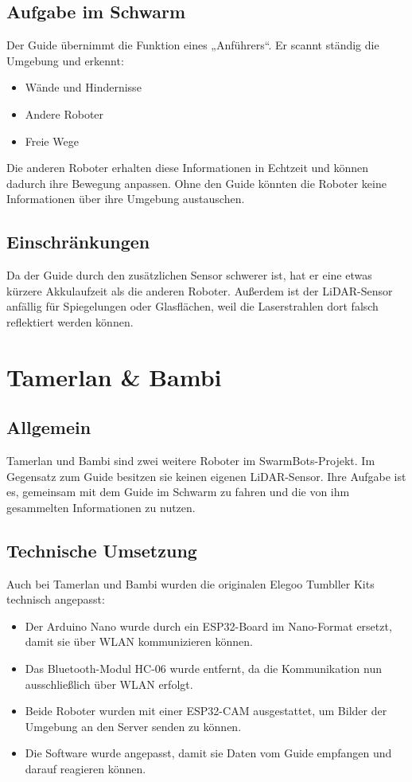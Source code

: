 \subsection{Aufgabe im Schwarm}
Der Guide übernimmt die Funktion eines „Anführers“.
Er scannt ständig die Umgebung und erkennt:
\begin{itemize}
    \item Wände und Hindernisse
    \item Andere Roboter
    \item Freie Wege
\end{itemize}
Die anderen Roboter erhalten diese Informationen in Echtzeit und können dadurch ihre Bewegung anpassen.
Ohne den Guide könnten die Roboter keine Informationen über ihre Umgebung austauschen.
%
\subsection{Einschränkungen}
Da der Guide durch den zusätzlichen Sensor schwerer ist, hat er eine etwas kürzere Akkulaufzeit als die anderen Roboter. Außerdem ist der LiDAR-Sensor anfällig für Spiegelungen oder Glasflächen, weil die Laserstrahlen dort falsch reflektiert werden können.

%
\section{Tamerlan \& Bambi}
\label{subsec:hardware_tamerlan_bambi}

\subsection{Allgemein}
Tamerlan und Bambi sind zwei weitere Roboter im SwarmBots-Projekt.
Im Gegensatz zum Guide besitzen sie keinen eigenen LiDAR-Sensor. Ihre Aufgabe ist es, gemeinsam mit dem Guide im Schwarm zu fahren und die von ihm gesammelten Informationen zu nutzen.
%
\subsection{Technische Umsetzung}
Auch bei Tamerlan und Bambi wurden die originalen Elegoo Tumbller Kits technisch angepasst:
\begin{itemize}
    \item Der Arduino Nano wurde durch ein ESP32-Board im Nano-Format ersetzt, damit sie über WLAN kommunizieren können.
    \item Das Bluetooth-Modul HC-06 wurde entfernt, da die Kommunikation nun ausschließlich über WLAN erfolgt.
    \item Beide Roboter wurden mit einer ESP32-CAM ausgestattet, um Bilder der Umgebung an den Server senden zu können.
    \item Die Software wurde angepasst, damit sie Daten vom Guide empfangen und darauf reagieren können.
\end{itemize}
%
